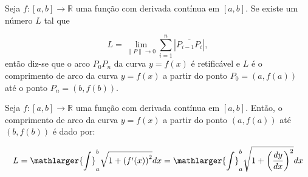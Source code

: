 \cleardoublepage\documentclass[../main.tex]{subfiles}
\begin{document}
\begin{framed}
\begin{definition}
    Seja \(f:[a,b] \to \mathbb{R}\) uma função com derivada contínua em \([a,b]\). Se existe um número \(L\) tal que

\[ L= \lim\limits_{\|P\|\to 0} \sum\limits^{n}_{i=1}\left|\overline{P_{i-1}P_i} \right|, \]
então diz-se que o arco \(P_0 P_n\) da curva \(y=f(x)\) é retificável e \(L\) é o comprimento de arco da curva \(y=f(x)\) a partir do ponto \(P_0=(a,f(a))\) até o ponto \(P_n=(b,f(b))\).
\end{definition}
\end{framed}
\begin{framed}
\begin{teo}
Seja \(f:[a,b] \to \mathbb{R}\) uma função com derivada contínua em \([a,b]\). Então, o comprimento de arco da curva \(y=f(x)\) a partir do ponto \((a,f(a))\) até \((b,f(b))\) é dado por:

\[ L=\mathlarger{\int}^{b}_{a} \sqrt{ 1+ \left(f'(x)\right)^2} dx= \mathlarger{\int}^{b}_{a} \sqrt{ 1+ \left(\dfrac{dy}{dx}\right)^2} dx \]
\end{teo}
\end{framed}
\end{document}
